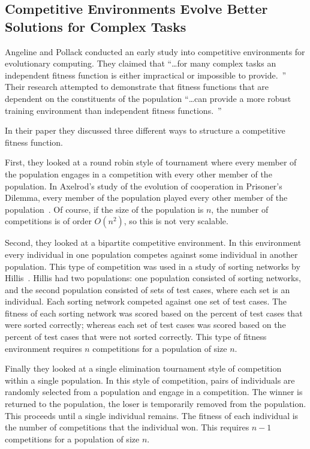 \subsection{Competitive Environments Evolve Better Solutions for Complex Tasks}

Angeline and Pollack conducted an early study into competitive environments for
evolutionary computing. They claimed that ``\ldots for many complex tasks an
independent fitness function is either impractical or impossible to
provide.~\cite{Angeline:1993:CEE:645513.657590}'' Their research attempted to
demonstrate that fitness functions that are dependent on the constituents of the
population ``\ldots can provide a more robust training environment than
independent fitness functions.~\cite{Angeline:1993:CEE:645513.657590}''

In their paper they discussed three different ways to structure a competitive
fitness function.

First, they looked at a round robin style of tournament where every member of
the population engages in a competition with every other member of the
population. In Axelrod's study of the evolution of cooperation in Prisoner's
Dilemma, every member of the population played every other member of
the population~\cite{Axelrod1984}. Of course, if the size of the population is
\(n\), the number of competitions is of order \(O(n^2)\), so this is not
very scalable.

Second, they looked at a bipartite competitive environment. In this environment
every individual in one population competes against some individual in another
population. This type of competition was used in a study of sorting networks by
Hillis~\cite{Hillis:1990:CPI:87498.87560}. Hillis had two populations: one
population consisted of sorting networks, and the second population consisted of
sets of test cases, where each set is an individual. Each sorting network
competed against one set of test cases. The fitness of each sorting network was
scored based on the percent of test cases that were sorted correctly; whereas
each set of test cases was scored based on the percent of test cases that were
not sorted correctly. This type of fitness environment requires \(n\)
competitions for a population of size \(n\).

Finally they looked at a single elimination tournament style of
competition within a single population. In this style of competition, pairs of
individuals are randomly selected from a population and engage in a competition.
The winner is returned to the population, the loser is temporarily removed from
the population. This proceeds until a single individual remains. The fitness of
each individual is the number of competitions that the individual won. This
requires \(n-1\) competitions for a population of size \(n\).

